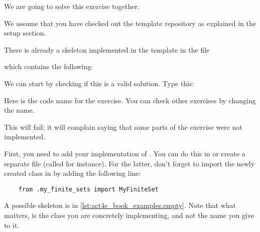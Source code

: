 We are going to solve this exercise together.

We assume that you have checked out the template repository as explained in the setup section.

There is already a skeleton implemented in the template in the file


which contains the following:

\begin{longcode}
    \caption{}

    \label{lst:act4e_book_examples.initial}
\end{longcode}

We can start by checking if this is a valid solution.
Type this:


Here  is the code name for the exercise.
You can check other exercises by changing the name.

This will fail; it will complain saying that some parts of the exercise were not implemented.


First, you need to add your implementation of .
You can do this in  or create a separate file (called  for instance).
For the latter, don't forget to import the newly created class in  by adding the following line:
\begin{verbatim}
    from .my_finite_sets import MyFiniteSet
\end{verbatim}
A possible skeleton is in \cref{lst:act4e_book_examples.empty}.
Note that what matters, is the class you are concretely implementing, and not the name you give to it.

\begin{longcode}
    \caption{}

    \label{lst:act4e_book_examples.empty}
\end{longcode}

